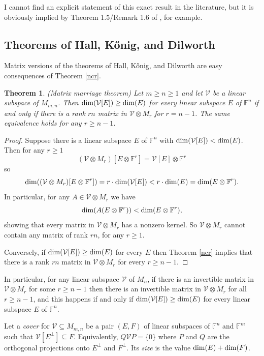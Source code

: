\documentclass{amsart}
\newtheorem{thm}{Theorem}[section]
\theoremstyle{definition}
\begin{document}
I cannot find an explicit statement of this exact result in the literature, but it is obviously implied by Theorem 1.5/Remark 1.6 of \cite{IQS}, for example.

\subsection{Theorems of Hall,  Kőnig, and Dilworth}

Matrix versions of the theorems of Hall, Kőnig, and Dilworth are easy consequences of Theorem \ref{ncr}.

\begin{thm} (Matrix marriage theorem)
Let $m \geq n \geq 1$ and let $\mathcal{V}$ be a linear subspace of $M_{m,n}$. Then ${\rm dim}(\mathcal{V}[E]) \geq {\rm dim}(E)$ for every linear subspace $E$ of $\mathbb{F}^n$ if and only if there is a rank $rn$ matrix in $\mathcal{V} \otimes M_r$ for $r = n-1$. The same equivalence holds for any $r \geq n - 1$.
\end{thm}

\begin{proof}
Suppose there is a linear subspace $E$ of $\mathbb{F}^n$ with ${\rm dim}(\mathcal{V}[E]) < {\rm dim}(E)$. Then for any $r \geq 1$ $$(\mathcal{V}\otimes M_r)[E\otimes \mathbb{F}^r] = \mathcal{V}[E]\otimes \mathbb{F}^r$$ so $${\rm dim}((\mathcal{V}\otimes M_r)[E\otimes \mathbb{F}^r]) = r\cdot {\rm dim}(\mathcal{V}[E]) < r\cdot {\rm dim}(E) = {\rm dim}(E\otimes \mathbb{F}^r).$$ In particular, for any $A \in \mathcal{V}\otimes M_r$ we have $${\rm dim}(A(E\otimes \mathbb{F}^r)) < {\rm dim}(E\otimes \mathbb{F}^r),$$ showing that every matrix in $\mathcal{V}\otimes M_r$ has a nonzero kernel. So $\mathcal{V}\otimes M_r$ cannot contain any matrix of rank $rn$, for any $r \geq 1$.

Conversely, if ${\rm dim}(\mathcal{V}[E]) \geq {\rm dim}(E)$ for every $E$ then Theorem \ref{ncr} implies that there is a rank $rn$ matrix in $\mathcal{V}\otimes M_r$ for every $r \geq n-1$.
\end{proof}

In particular, for any linear subspace $\mathcal{V}$ of $M_n$, if there is an invertible matrix in $\mathcal{V}\otimes M_r$ for some $r \geq n - 1$ then there is an invertible matrix in $\mathcal{V}\otimes M_r$ for all $r \geq n - 1$, and this happens if and only if ${\rm dim}(\mathcal{V}[E]) \geq {\rm dim}(E)$ for every linear subspace $E$ of $\mathbb{F}^n$.

Let a {\it cover} for $\mathcal{V} \subseteq M_{m,n}$ be a pair $(E,F)$ of linear subspaces of $\mathbb{F}^n$ and $\mathbb{F}^m$ such that $\mathcal{V}[E^\perp] \subseteq F$. Equivalently, $Q\mathcal{V}P = \{0\}$ where $P$ and $Q$ are the orthogonal projections onto $E^\perp$ and $F^\perp$. Its {\it size} is the value ${\rm dim}(E) + {\rm dim}(F)$.
\end{document}
